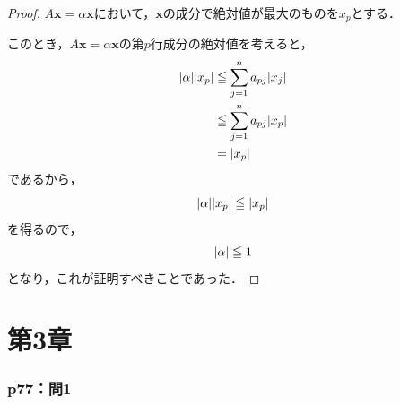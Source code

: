 \documentclass[a4paper,10pt,fleqn]{ltjsarticle}
\begin{document}
\begin{tleftbar}
  \begin{proof}
    $ A \bm{x}=\alpha \bm{x}$において，$\bm{x}$の成分で絶対値が最大のものを$x_p$とする．

    このとき，$ A \bm{x} = \alpha \bm{x}$の第$p$行成分の絶対値を考えると，
    \begin{align*}
      \abs{\alpha} \abs{x_p} & \leqq \sum_{j=1}^{n} a_{pj} \abs{x_j} \\
                             & \leqq \sum_{j=1}^{n} a_{pj} \abs{x_p} \\
                             & = \abs{x_p}
    \end{align*}
    であるから，
    \[
      \abs{\alpha} \abs{x_p} \leqq \abs{x_p}
    \]
    を得るので，
    \[
      \abs{\alpha} \leqq 1
    \]
    となり，これが証明すべきことであった．
  \end{proof}
\end{tleftbar}

\newpage


\part*{第3章}


\section*{p77：問1}

\end{document}
